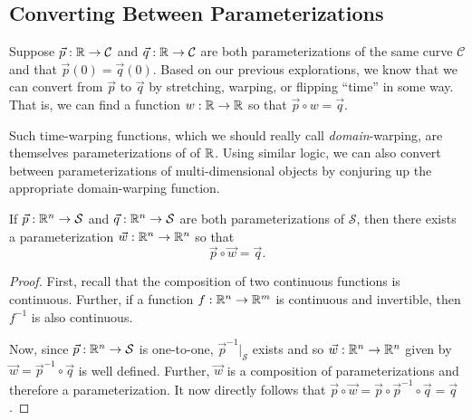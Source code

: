 \subsection{Converting Between Parameterizations}
Suppose $\vec p:\mathbb{R}\to\mathcal C$ and $\vec q:\mathbb{R}\to\mathcal C$ are both parameterizations of
the same curve $\mathcal C$ and that $\vec p(0)=\vec q(0)$.  Based on our previous explorations,
we know that we can convert from $\vec p$ to $\vec q$ by stretching, warping, or flipping ``time''
in some way.  That is, we can find a function $w:\mathbb{R}\to\mathbb{R}$ so that $\vec p\circ w=\vec q$.

Such time-warping functions, which we should really call \emph{domain}-warping,
are themselves parameterizations of of $\mathbb{R}$.  Using similar logic, we can also
convert between parameterizations of multi-dimensional objects by conjuring up the
appropriate domain-warping function.

\begin{theorem}
	If $\vec p:\mathbb{R}^n\to\mathcal S$ and $\vec q:\mathbb{R}^n\to\mathcal S$ are both
	parameterizations of $\mathcal S$, then there exists a parameterization
	$\vec w:\mathbb{R}^n\to\mathbb{R}^n$ so that 
	\[
		\vec p\circ \vec w = \vec q.
	\]
\end{theorem}
\begin{proof}
	First, recall that the composition of two continuous functions is continuous.  Further,
	if a function $f:\mathbb{R}^n\to\mathbb{R}^m$ is continuous and invertible, then $f^{-1}$ is also continuous.

	Now, since $\vec p:\mathbb{R}^n\to\mathcal S$ is one-to-one, $\vec p^{-1}\Big|_{\mathcal S}$ exists
	and so $\vec w:\mathbb{R}^n\to\mathbb{R}^n$ given by $\vec w=\vec p^{-1}\circ\vec q$ is well defined.  Further, $\vec w$
	is a composition of parameterizations and therefore a parameterization.  It now directly follows that
	$\vec p\circ \vec w= \vec p\circ\vec p^{-1}\circ \vec q = \vec q$.
\end{proof}

